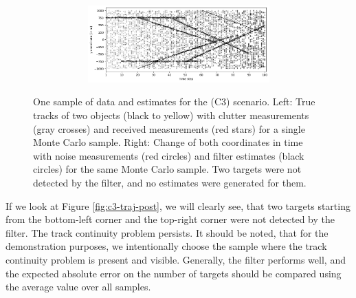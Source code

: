 \begin{figure}
\begin{subfigure}[]{0.48\linewidth}
        \vfill\par
        \begin{subfigure}[b]{\linewidth}
            \includegraphics[width=\linewidth]{figures/c3-y-estimates.png}
        \end{subfigure}
    \end{subfigure}
  \caption[One sample of data and estimates for the (C3) scenario.]{One sample of data and estimates for the (C3) scenario. Left: True tracks of two objects (black to yellow) with clutter measurements (gray crosses) and received measurements (red stars) for a single Monte Carlo sample. Right: Change of both coordinates in time with noise measurements (red circles) and filter estimates (black circles) for the same Monte Carlo sample. Two targets were not detected by the filter, and no estimates were generated for them.}
  \label{fig:c3-results-overview}
\end{figure}


If we look at Figure \ref{fig:c3-traj-post}, we will clearly see, that two targets starting from the bottom-left corner and the top-right corner were not detected by the filter. The track continuity problem persists. It should be noted, that for the demonstration purposes, we intentionally choose the sample where the track continuity problem is present and visible. Generally, the filter performs well, and the expected absolute error on the number of targets should be compared using the average value over all samples.

